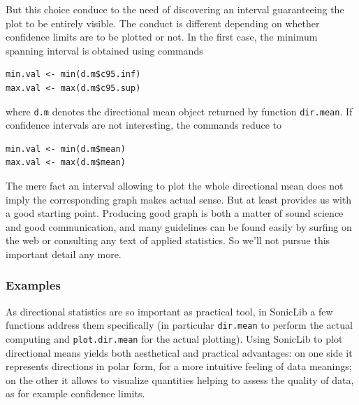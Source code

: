 \documentclass[a4paper,10pt]{book}
\begin{document}
But this choice conduce to the need of discovering an interval guaranteeing the plot to be entirely visible. The conduct is different depending on whether confidence limits are to be plotted or not. In the first case, the minimum spanning interval is obtained using commands

\begin{verbatim}
min.val <- min(d.m$c95.inf)
max.val <- max(d.m$c95.sup)
\end{verbatim}

\noindent where \verb|d.m| denotes the directional mean object returned by function \verb|dir.mean|. If confidence intervals are not interesting, the commands reduce to

\begin{verbatim}
min.val <- min(d.m$mean)
max.val <- max(d.m$mean)
\end{verbatim}

The mere fact an interval allowing to plot the whole directional mean does not imply the corresponding graph makes actual sense. But at least provides us with a good starting point. Producing good graph is both a matter of sound science and good communication, and many guidelines can be found easily by surfing on the web or consulting any text of applied statistics. So we'll not pursue this important detail any more.


\subsubsection{Examples}

As directional statistics are so important as practical tool, in SonicLib a few functions address them specifically (in particular \verb|dir.mean| to perform the actual computing and \verb|plot.dir.mean| for the actual plotting). Using SonicLib to plot directional means yields both aesthetical and practical advantages: on one side it represents directions in polar form, for a more intuitive feeling of data meanings; on the other it allows to visualize quantities helping to assess the quality of data, as for example confidence limits.
\end{document}
